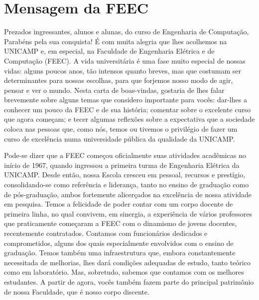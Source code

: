 \section{Mensagem da FEEC}

Prezados ingressantes, alunos e alunas, do curso de Engenharia de Computação,\\

Parabéns pela sua conquista! É com muita alegria que lhes acolhemos na UNICAMP
e, em especial, na Faculdade de Engenharia Elétrica e de Computação (FEEC). A
vida universitária é uma fase muito especial de nossas vidas: alguns poucos
anos, tão intensos quanto breves, mas que costumam ser determinantes para
nossas escolhas, para que forjemos nosso modo de agir, pensar e ver o mundo.
Nesta carta de boas-vindas, gostaria de lhes falar brevemente sobre alguns
temas que considero importante para vocês: dar-lhes a conhecer um pouco da FEEC
e de sua história; comentar sobre o excelente curso que agora começam; e tecer
algumas reflexões sobre a expectativa que a sociedade coloca nas pessoas que,
como nós, temos ou tivemos o privilégio de fazer um curso de excelência numa
universidade pública da qualidade da UNICAMP.

Pode-se dizer que a FEEC começou oficialmente suas atividades acadêmicas no
início de 1967, quando ingressou a primeira turma de Engenharia Elétrica da
UNICAMP. Desde então, nossa Escola cresceu em pessoal, recursos e prestígio,
consolidando-se como referência e liderança, tanto no ensino de graduação como
de pós-graduação, ambos fortemente alicerçados na excelência de nossa atividade
em pesquisa. Temos a felicidade de poder contar com um corpo docente de
primeira linha, no qual convivem, em sinergia, a experiência de vários
professores que praticamente começaram a FEEC com o dinamismo de jovens
docentes, recentemente contratados. Contamos com funcionários dedicados e
comprometidos, alguns dos quais especialmente envolvidos com o ensino de
graduação. Temos também uma infraestrutura que, embora constantemente
necessitada de melhorias, lhes dará condições adequadas de estudo, tanto
teórico como em laboratório. Mas, sobretudo, sabemos que contamos com os
melhores estudantes. A partir de agora, vocês também fazem parte do principal
patrimônio de nossa Faculdade, que é nosso corpo discente.

